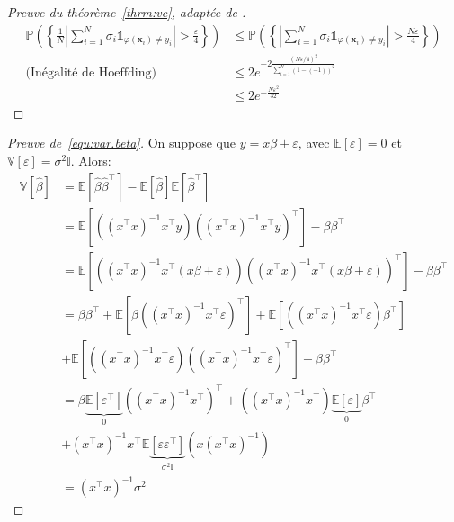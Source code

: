 \begin{proof}[Preuve du théorème~\ref{thrm:vc}, adaptée de \citet{Devroye1997}]
    \begin{align*}
        \mathbb{P} \left( \left\{ \frac{1}{N} \left\vert \sum_{i=1}^N \sigma_i \mathds{1}_{\varphi (\mathbf{x}_i) \neq y_i } \right\vert > \frac{\varepsilon}{4} \right\} \right) &\leq \mathbb{P} \left( \left\{ \left\vert \sum_{i=1}^N \sigma_i \mathds{1}_{\varphi (\mathbf{x}_i) \neq y_i } \right\vert > \frac{N \varepsilon}{4} \right\} \right) \\
        \text{(Inégalité de Hoeffding)} \qquad &\leq 2 e^{- 2 \frac{\left(N \varepsilon / 4\right)^2}{\sum_{i=1}^N \left(1- \left(-1\right)\right)^2}} \\
        &\leq 2 e^{-\frac{N \varepsilon^2}{32}}
    \end{align*}
\end{proof}

\begin{proof}[Preuve de~\ref{equ:var.beta}]
    On suppose que $y = x\beta + \varepsilon$, avec $\mathbb{E} [\varepsilon] = 0$ et $\mathbb{V} [\varepsilon] = \sigma^2 \mathds{I}$. Alors:
    \begin{align*}
        \mathbb{V} \left[ \hat{\beta} \right] &= \mathbb{E} \left[ \hat{\beta} \hat{\beta}^\intercal \right] - \mathbb{E} \left[ \hat{\beta} \right] \mathbb{E} \left[ \hat{\beta}^\intercal \right] \\
        &= \mathbb{E} \left[ \left( (x^\intercal x)^{-1} x^\intercal y \right) \left( (x^\intercal x)^{-1} x^\intercal y \right)^\intercal \right] - \beta \beta^\intercal \\
        &= \mathbb{E} \left[ \left( (x^\intercal x)^{-1} x^\intercal ( x \beta + \varepsilon ) \right) \left( (x^\intercal x)^{-1} x^\intercal ( x \beta + \varepsilon ) \right)^\intercal \right] - \beta \beta^\intercal \\
        &= \beta \beta^\intercal + \mathbb{E} \left[ \beta \left( (x^\intercal x)^{-1} x^\intercal \varepsilon \right)^\intercal \right] + \mathbb{E} \left[ \left( (x^\intercal x)^{-1} x^\intercal \varepsilon \right) \beta^\intercal \right] \\
        &+ \mathbb{E} \left[ \left( (x^\intercal x)^{-1} x^\intercal \varepsilon \right) \left( (x^\intercal x)^{-1} x^\intercal \varepsilon \right)^\intercal \right] - \beta \beta^\intercal \\
        &= \beta \underbrace{\mathbb{E} \left[ \varepsilon^\intercal \right]}_0 \left( (x^\intercal x)^{-1} x^\intercal \right)^\intercal + \left( (x^\intercal x)^{-1} x^\intercal  \right) \underbrace{ \mathbb{E} \left[ \varepsilon \right] }_0 \beta^\intercal \\
        &+  (x^\intercal x)^{-1} x^\intercal \mathbb{E} \underbrace{\left[\varepsilon \varepsilon^\intercal \right]}_{ \sigma^2 \mathds{I} } \left( x (x^\intercal x)^{-1} \right) \\
        &= \left( x^\intercal x \right)^{-1} \sigma^2
    \end{align*}
\end{proof}

